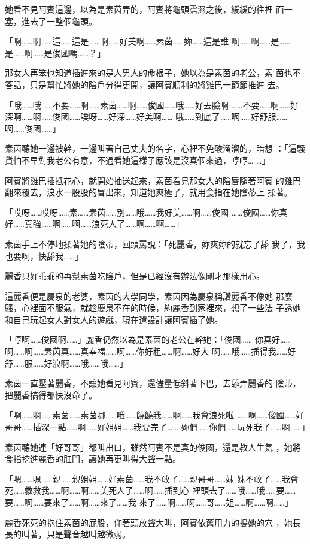 她看不見阿賓這邊，以為是素茵弄的，阿賓將龜頭霑濕之後，緩緩的往裡
面一塞，進去了一整個龜頭。

「啊……啊……這……這是……啊……好美啊……素茵……妳……這是誰
啊……啊……是……是……啊……是俊國嗎……？」

那女人再笨也知道插進來的是人男人的命根子，她以為是素茵的老公，素
茵也不答話，只是幫忙將她的陰戶分得更開，讓阿賓順利的將雞巴一節節推進
去。

「哦……哦……不要……啊……素茵……啊……俊國……哦……好丟臉啊
……不要……啊……好深啊……啊……俊國……唉呀……好深……好美啊……
哦……到底了……啊……好舒服……啊……俊國……」

素茵聽她一邊被幹，一邊叫著自己丈夫的名字，心裡不免酸溜溜的，暗想
：「這騷貨怕不早對我老公有意，不過看她這樣子應該是沒真個來過，哼哼…
…」

阿賓將雞巴插抵花心，就開始抽送起來，素茵看見那女人的陰唇隨著阿賓
的雞巴翻來覆去，浪水一股股的冒出來，知道她爽極了，就用食指在她陰蒂上
揉著。

「哎呀……哎呀……素……素茵……別……哦……我好美……啊……俊國
……俊國……你真好……真強……啊……啊……浪死人了……啊……啊……」

素茵手上不停地揉著她的陰蒂，回頭罵說：「死麗香，妳爽妳的就忘了舔
我了，我也要啊，快舔我……」

麗香只好乖乖的再幫素茵吃陰戶，但是已經沒有辦法像剛才那樣用心。

這麗香便是慶泉的老婆，素茵的大學同學，素茵因為慶泉稱讚麗香不像她
那麼騷，心裡面不服氣，就趁慶泉不在的時候，約麗香到家裡來，想了一些法
子誘她和自己玩起女人對女人的遊戲，現在還設計讓阿賓插了她。

「哼啊……俊國啊……」麗香仍然以為是素茵的老公在幹她：「俊國……
你真好……啊……啊……素茵真……真幸福……啊……你好粗……啊……好大
啊……哦……插得我……好舒……服……好浪啊……哦……哦……」

素茵一直壓著麗香，不讓她看見阿賓，還儘量低斜著下巴，去舔弄麗香的
陰蒂，把麗香搞得都快沒命了。

「啊……啊……素茵……素茵哪……哦……饒饒我……啊……我會浪死啦
……啊……俊國……好哥哥……插深一點……啊……好姐姐……我要完了……
妳們……你們……玩死我了……啊……」

素茵聽她連「好哥哥」都叫出口，雖然阿賓不是真的俊國，還是教人生氣
，她將食指挖進麗香的肛門，讓她再更叫得大聲一點。

「嗯……嗯……親……親姐姐……好素茵……我不敢了……親哥哥……妹
妹不敢了……我會死……救救我……啊……啊……美死人了……啊……插到心
裡頭去了……哦……哦……要……要……啊……要來了……啊……來了……我
來了……啊……啊……哥……姐……啊……啊……」

麗香死死的抱住素茵的屁股，仰著頭放聲大叫，阿賓依舊用力的搗她的穴
，她長長的叫著，只是聲音越叫越微弱。

